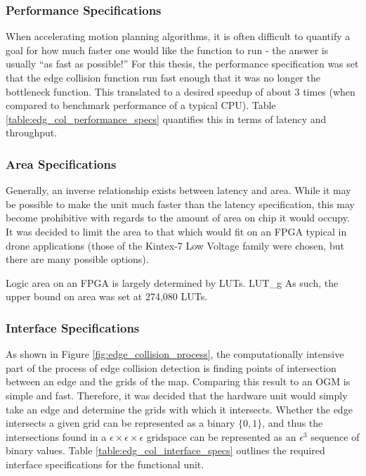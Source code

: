     \subsubsection{Performance Specifications}
        When accelerating motion planning algorithms, it is often difficult to quantify a goal for how much faster one would like the function to run - the answer is usually ``as fast as possible!'' For this thesis, the performance specification was set that the edge collision function run fast enough that it was no longer the bottleneck function. This translated to a desired speedup of about 3 times (when compared to benchmark performance of a typical CPU). Table \ref{table:edg_col_performance_specs} quantifies this in terms of latency and throughput.

        

\newpage

\subsubsection{Area Specifications}
    Generally, an inverse relationship exists between latency and area. While it may be possible to make the unit much faster than the latency specification, this may become prohibitive with regards to the amount of area on chip it would occupy. It was decided to limit the area to that which would fit on an \gls{FPGA} typical in drone applications (those of the Kintex-7 Low Voltage family were chosen, but there are many possible options). 

    Logic area on an FPGA is largely determined by \glspl{LUT}. \glsdesc{LUT_g} As such, the upper bound on area was set at 274,080 \glspl{LUT}.

\subsubsection{Interface Specifications}
\label{subsection:HoneyBeeTechSpechs}
    As shown in Figure \ref{fig:edge_collision_process}, the computationally intensive part of the process of edge collision detection is finding points of intersection between an edge and the grids of the map. Comparing this result to an \gls{OGM} is simple and fast. Therefore, it was decided that the hardware unit would simply take an edge and determine the grids with which it intersects. Whether the edge intersects a given grid can be represented as a binary $\{0,1\}$, and thus the intersections found in a $\epsilon \times \epsilon\times\epsilon$ gridspace can be represented as an $\epsilon^3$ sequence of binary values.
    Table \ref{table:edg_col_interface_specs} outlines the required interface specifications for the functional unit.
    